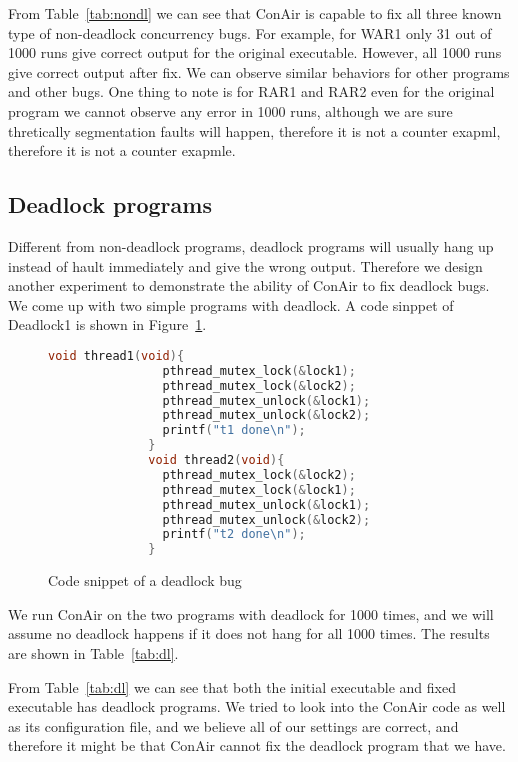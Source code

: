 

From Table~\ref{tab:nondl} we can see that ConAir is capable to fix all three
known type of non-deadlock concurrency bugs. For example, for WAR1 only 31 out
of 1000 runs give correct output for the original executable. However, all 1000
runs give correct output after fix. We can observe similar behaviors for other
programs and other bugs. One thing to note is for RAR1 and RAR2 even for the
original program we cannot observe any error in 1000 runs, although we are sure
thretically segmentation faults will happen, therefore it is not a counter
exapml, therefore it is not a counter exapmle.

\subsection{Deadlock programs}
Different from non-deadlock programs, deadlock programs will usually hang up
instead of hault immediately and give the wrong output. Therefore we design
another experiment to demonstrate the ability of ConAir to fix deadlock bugs.
We come up with two simple programs with deadlock. A code sinppet of Deadlock1
is shown in Figure~\ref{fig:deadlock-code}.
\begin{figure}[htbp]
\begin{center}
\begin{lstlisting}[language=C]
              void thread1(void){
                pthread_mutex_lock(&lock1);
                pthread_mutex_lock(&lock2);
                pthread_mutex_unlock(&lock1);
                pthread_mutex_unlock(&lock2);
                printf("t1 done\n");
              }
              void thread2(void){
                pthread_mutex_lock(&lock2);
                pthread_mutex_lock(&lock1);
                pthread_mutex_unlock(&lock1);
                pthread_mutex_unlock(&lock2);
                printf("t2 done\n");
              }
\end{lstlisting}
\caption{Code snippet of a deadlock bug}
\end{center}
\label{fig:deadlock-code}
\end{figure}

We run ConAir on the two programs with deadlock for 1000 times, and we will
assume no deadlock happens if it does not hang for all 1000 times. The results
are shown in Table~\ref{tab:dl}.



From Table~\ref{tab:dl} we can see that both the initial executable and fixed
executable has deadlock programs. We tried to look into the ConAir code as well
as its configuration file, and we believe all of our settings are correct, and
therefore it might be that ConAir cannot fix the deadlock program that we have.

